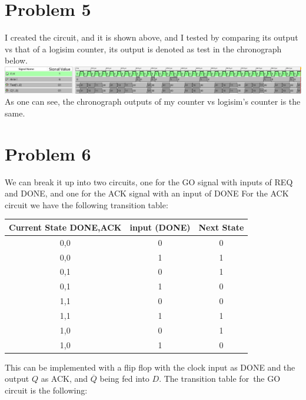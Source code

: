 \documentclass[12pt]{article}
\begin{document}
\section*{Problem 5}
I created the circuit, and it is shown above, and I tested 
by comparing its output vs that of a logisim counter, its output is denoted
as test in the chronograph below.\\
\includegraphics[scale=0.2]{fig8.png}
As one can see, the chronograph outputs of my counter vs logisim's counter is the same.
\section*{Problem 6}
We can break it up into two circuits, one for the GO signal with inputs of REQ and DONE, and one for the ACK signal with an input of DONE
For the ACK circuit we have the following transition table:
\begin{center}
    
    \begin{tabular}{|c|c|c|}
        Current State DONE,ACK & input (DONE) & Next State \\
        \hline
        0,0 & 0 & 0\\
        \hline
        0,0 & 1 & 1\\
        \hline
        0,1 & 0 & 1\\
        \hline
        0,1 & 1 & 0\\
        \hline
        1,1 & 0 & 0\\
        \hline
        1,1 & 1 & 1\\
        \hline
        1,0 & 0 & 1\\
        \hline
        1,0 & 1 & 0\\
        \hline
    \end{tabular}
\end{center}
This can be implemented with a flip flop with the clock input as DONE and the
output $Q$ as ACK, and $\overline{Q}$ being fed into $D$. The transition table for\
the GO circuit is the following:
\end{document}
